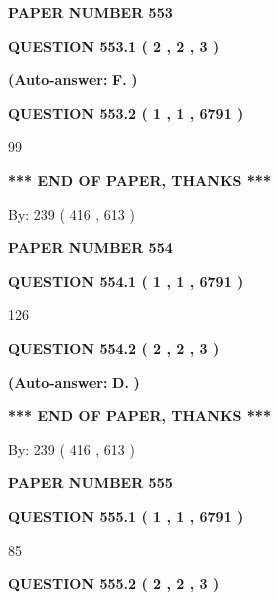 \documentclass{ctexart}
\begin{document}
   
\newpage 
\setcounter{page}{ 
   553001 } 
   
   
 {\textbf{ \Large{ PAPER NUMBER  553  }}}
   
   
   
   
  
  
{\textbf{\large{QUESTION
553.1 
 ( 2 , 2 , 3 )
}}}
 
 
{\textbf{(Auto-answer:}}
{\textbf{\large{
F.}}}
{\textbf{)}}
 
 
  
  
{\textbf{\large{QUESTION
553.2 
 ( 1 , 1 , 6791 )
}}}

99
   
   
   
   
\vspace{1.0in} 
{\textbf{\large{ *** END OF PAPER, THANKS *** }}} 
   
   
\hspace{1.0in} By: 
 239 ( 416 ,  613 )
   
   
   
   
\newpage 
\setcounter{page}{ 
   554001 } 
   
   
 {\textbf{ \Large{ PAPER NUMBER  554  }}}
   
   
   
   
  
  
{\textbf{\large{QUESTION
554.1 
 ( 1 , 1 , 6791 )
}}}

126
  
  
{\textbf{\large{QUESTION
554.2 
 ( 2 , 2 , 3 )
}}}
 
 
{\textbf{(Auto-answer:}}
{\textbf{\large{
D.}}}
{\textbf{)}}
 
 
   
   
   
   
\vspace{1.0in} 
{\textbf{\large{ *** END OF PAPER, THANKS *** }}} 
   
   
\hspace{1.0in} By: 
 239 ( 416 ,  613 )
   
   
   
   
\newpage 
\setcounter{page}{ 
   555001 } 
   
   
 {\textbf{ \Large{ PAPER NUMBER  555  }}}
   
   
   
   
  
  
{\textbf{\large{QUESTION
555.1 
 ( 1 , 1 , 6791 )
}}}

85
  
  
{\textbf{\large{QUESTION
555.2 
 ( 2 , 2 , 3 )
}}}
 
\end{document}
